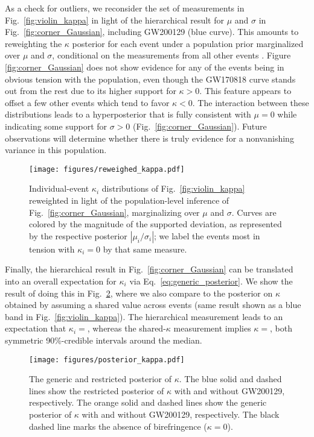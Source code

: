 \documentclass[aps,prd,twocolumn,superscriptaddress,preprintnumbers,floatfix,nofootinbib]{revtex4-2}
\begin{document}
As a check for outliers, we reconsider the set of measurements in Fig.~\ref{fig:violin_kappa} in light of the hierarchical result for $\mu$ and $\sigma$ in Fig.~\ref{fig:corner_Gaussian}, including GW200129 (blue curve).
This amounts to reweighting the $\kappa$ posterior for each event under a population prior marginalized over $\mu$ and $\sigma$, conditional on the measurements from all other events \cite{Callister:T2100301}.
Figure \ref{fig:corner_Gaussian} does not show evidence for any of the events being in obvious tension with the population, even though the GW170818 curve stands out from the rest due to its higher support for $\kappa > 0$.
This feature appears to offset a few other events which tend to favor $\kappa < 0$.
The interaction between these distributions leads to a hyperposterior that is fully consistent with $\mu = 0$ while indicating some support for $\sigma > 0$ (Fig.~\ref{fig:corner_Gaussian}).
Future observations will determine whether there is truly evidence for a nonvanishing variance in this population.

\begin{figure}
    \texttt{[image: figures/reweighed\_kappa.pdf]}
    \caption{
        Individual-event $\kappa_i$ distributions of Fig.~\ref{fig:violin_kappa} reweighted in light of the population-level inference of Fig.~\ref{fig:corner_Gaussian}, marginalizing over $\mu$ and $\sigma$.
        Curves are colored by the magnitude of the supported deviation, as represented by the respective posterior $|\mu_i / \sigma_i|$; we label the events most in tension with $\kappa_i = 0$ by that same measure.
    }
    \label{fig:reweighted_kappa}
\end{figure}

Finally, the hierarchical result in Fig.~\ref{fig:corner_Gaussian} can be translated into an overall expectation for $\kappa_i$ via Eq.~\eqref{eq:generic_posterior}.
We show the result of doing this in Fig.~\ref{fig:posterior_kappa}, where we also compare to the posterior on $\kappa$ obtained by assuming a shared value across events (same result shown as a blue band in Fig.~\ref{fig:violin_kappa}).
The hierarchical measurement leads to an expectation that $\kappa_i = $, whereas the shared-$\kappa$ measurement implies $\kappa = $, both symmetric 90\%-credible intervals around the median.  

\begin{figure}
    \texttt{[image: figures/posterior\_kappa.pdf]}
    \caption{
        The generic and restricted posterior of $\kappa$.
        The blue solid and dashed lines show the restricted posterior of $\kappa$ with and without GW200129, respectively.
        The orange solid and dashed lines show the generic posterior of $\kappa$ with and without GW200129, respectively.
        The black dashed line marks the absence of birefringence ($\kappa=0$).
    }
    \label{fig:posterior_kappa}
\end{figure}
\end{document}
